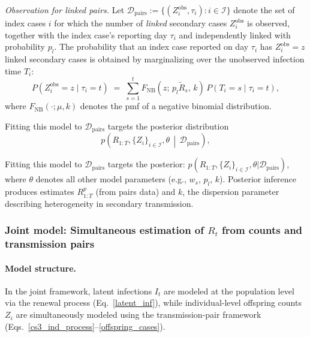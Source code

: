 \documentclass{article}
\begin{document}
\emph{Observation for linked pairs.} Let $\mathcal{D}_{\mathrm{pairs}}:=\{(Z^{\text{obs}}_i, \tau_i): i\in\mathcal{I}\}$ denote the set of index cases $i$ for which the number of \emph{linked} secondary cases $Z^{\text{obs}}_i$ is observed, together with the index case’s reporting day $\tau_i$ and independently linked with probability $p_l$. The probability that an index case reported on day $\tau_i$ has $Z^{\text{obs}}_i=z$ linked secondary cases is obtained by marginalizing over the unobserved infection time $T_i$:  
\begin{equation}
    P(Z^{\text{obs}}_i=z \mid \tau_i=t) \;=\; \sum_{s=1}^{t} F_{\mathrm{NB}}\!\left(z;\, p_l \tilde{R}_s,\, k\right) \, P(T_i=s \mid \tau_i=t),
\end{equation}
where $F_{\mathrm{NB}}(\cdot;\mu,k)$ denotes the pmf of a negative binomial distribution.


Fitting this model to $\mathcal{D}_{\mathrm{pairs}}$ targets the posterior distribution
\begin{equation}
    p\!\left(R_{1:T}, \{Z_i\}_{i\in\mathcal{I}}, \theta \,\middle|\, \mathcal{D}_{\mathrm{pairs}}\right),
\end{equation}

Fitting this model to $\mathcal{D}_{\mathrm{pairs}}$ targets the posterior: $\label{cs3_post_pairs}
p\left(R_{1:T}, \{Z_i\}_{i\in\mathcal{I}},\theta |\mathcal{D}_{\text{pairs}}\right)$, where $\theta$ denotes all other model parameters (e.g., $w_s$, $p_l$, $k$).  Posterior inference produces estimates $R_{1:T}^p$ (from pairs data) and $k$, the dispersion parameter describing heterogeneity in secondary transmission.

\subsubsection{Joint model: Simultaneous estimation of $R_{t}$ from counts and transmission pairs}

\paragraph{Model structure.}
In the joint framework, latent infections $I_t$ are modeled at the population level via the renewal process (Eq.~\eqref{latent_inf}), while individual-level offspring counts $Z_i$ are simultaneously modeled using the transmission-pair framework (Eqs.~\eqref{cs3_ind_process}--\eqref{offspring_cases}).  
\end{document}
